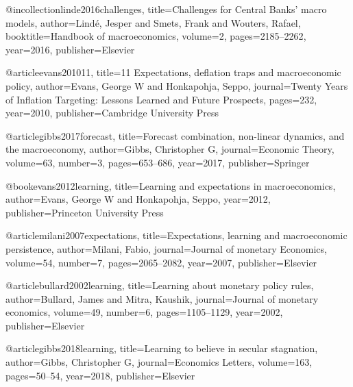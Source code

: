 @incollection{linde2016challenges,
  title={Challenges for Central Banks’ macro models},
  author={Lind{\'e}, Jesper and Smets, Frank and Wouters, Rafael},
  booktitle={Handbook of macroeconomics},
  volume={2},
  pages={2185--2262},
  year={2016},
  publisher={Elsevier}
}

@article{evans201011,
  title={11 Expectations, deflation traps and macroeconomic policy},
  author={Evans, George W and Honkapohja, Seppo},
  journal={Twenty Years of Inflation Targeting: Lessons Learned and Future Prospects},
  pages={232},
  year={2010},
  publisher={Cambridge University Press}
}


@article{gibbs2017forecast,
  title={Forecast combination, non-linear dynamics, and the macroeconomy},
  author={Gibbs, Christopher G},
  journal={Economic Theory},
  volume={63},
  number={3},
  pages={653--686},
  year={2017},
  publisher={Springer}
}

@book{evans2012learning,
  title={Learning and expectations in macroeconomics},
  author={Evans, George W and Honkapohja, Seppo},
  year={2012},
  publisher={Princeton University Press}
}

@article{milani2007expectations,
  title={Expectations, learning and macroeconomic persistence},
  author={Milani, Fabio},
  journal={Journal of monetary Economics},
  volume={54},
  number={7},
  pages={2065--2082},
  year={2007},
  publisher={Elsevier}
}


@article{bullard2002learning,
  title={Learning about monetary policy rules},
  author={Bullard, James and Mitra, Kaushik},
  journal={Journal of monetary economics},
  volume={49},
  number={6},
  pages={1105--1129},
  year={2002},
  publisher={Elsevier}
}


@article{gibbs2018learning,
  title={Learning to believe in secular stagnation},
  author={Gibbs, Christopher G},
  journal={Economics Letters},
  volume={163},
  pages={50--54},
  year={2018},
  publisher={Elsevier}
}